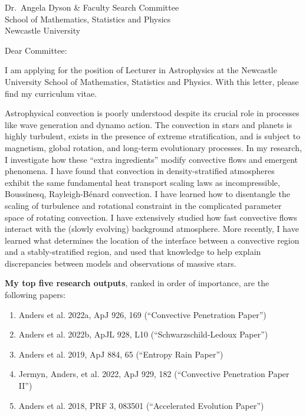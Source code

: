 \documentclass[12pt]{letter}
\begin{document}
\begin{letter}{
        Dr.~Angela Dyson \& Faculty Search Committee \\
        School of Mathematics, Statistics and Physics \\
        Newcastle University}
\opening{Dear Committee:}

    I am applying for the position of Lecturer in Astrophysics at the Newcastle University School of Mathematics, Statistics and Physics.
    With this letter, please find my curriculum vitae.

    Astrophysical convection is poorly understood despite its crucial role in processes like wave generation and dynamo action.
    The convection in stars and planets is highly turbulent, exists in the presence of extreme stratification, and is subject to magnetism, global rotation, and long-term evolutionary processes.
    In my research, I investigate how these ``extra ingredients'' modify convective flows and emergent phenomena.
    I have found that convection in density-stratified atmospheres exhibit the same fundamental heat transport scaling laws as incompressible, Boussinesq, Rayleigh-B\'{e}nard convection.
    I have learned how to disentangle the scaling of turbulence and rotational constraint in the complicated parameter space of rotating convection.
    I have extensively studied how fast convective flows interact with the (slowly evolving) background atmosphere.
    More recently, I have learned what determines the location of the interface between a convective region and a stably-stratified region, and used that knowledge to help explain discrepancies between models and observations of massive stars.

    \textbf{My top five research outputs}, ranked in order of importance, are the following papers:
    \begin{enumerate}
        \item Anders et al. 2022a, ApJ 926, 169 (“Convective Penetration Paper”)
        \item Anders et al. 2022b, ApJL 928, L10 (“Schwarzschild-Ledoux Paper”)
        \item Anders et al. 2019, ApJ 884, 65 (“Entropy Rain Paper”)
        \item Jermyn, Anders, et al. 2022, ApJ 929, 182 (“Convective Penetration Paper II”)
        \item Anders et al. 2018, PRF 3, 083501 (“Accelerated Evolution Paper”)
    \end{enumerate}


\end{letter}
\end{document}
